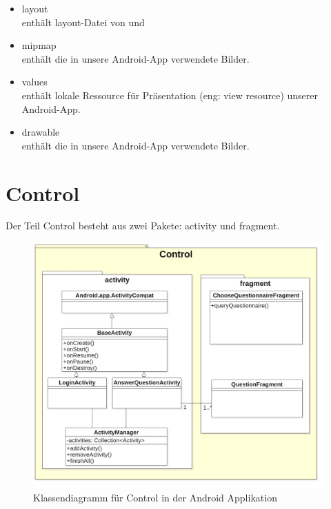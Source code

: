 \documentclass[a4paper]{scrreprt}
\begin{document}
{            \begin{itemize}
                \item {\large layout} \\
                    enthält layout-Datei von  und 
                \item {\large mipmap} \\
                    enthält die in unsere Android-App verwendete Bilder.
                \item {\large values}\\
                    enthält lokale Ressource für Präsentation (eng: view resource) unserer Android-App.
                \item {\large drawable}\\
                    enthält die in unsere Android-App verwendete Bilder.
            \end{itemize}




        \section{Control}
            Der Teil Control besteht aus zwei Pakete: activity und fragment.

            \vspace*{1cm}
            \begin{figure}[H]
                \includegraphics[scale = 0.35]{Control.jpg}
                \caption{Klassendiagramm für Control in der Android Applikation }
            \end{figure}

}
\end{document}
